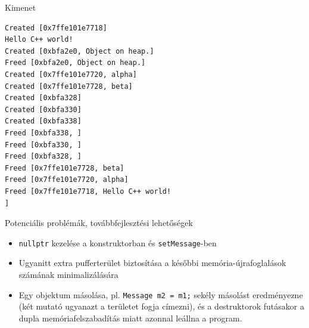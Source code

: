 \documentclass[usenames,dvipsnames,aspectratio=169]{beamer}
\begin{document}
\begin{frame}
    \begin{exampleblock}{}
        \scriptsize
        
    \end{exampleblock}
\end{frame}

\begin{frame}
    \begin{exampleblock}{}
        \footnotesize
        
    \end{exampleblock}
\end{frame}

\begin{frame}[fragile]
    \begin{block}{Kimenet}
        \scriptsize
        \vspace{-0.3cm}
        \begin{verbatim}
Created [0x7ffe101e7718]
Hello C++ world!
Created [0xbfa2e0, Object on heap.]
Freed [0xbfa2e0, Object on heap.]
Created [0x7ffe101e7720, alpha]
Created [0x7ffe101e7728, beta]
Created [0xbfa328]
Created [0xbfa330]
Created [0xbfa338]
Freed [0xbfa338, ]
Freed [0xbfa330, ]
Freed [0xbfa328, ]
Freed [0x7ffe101e7728, beta]
Freed [0x7ffe101e7720, alpha]
Freed [0x7ffe101e7718, Hello C++ world!
]
\end{verbatim}
        \vspace{-0.3cm}
    \end{block}
\end{frame}

\begin{frame}
    Potenciális problémák, továbbfejlesztési lehetőségek
    \begin{itemize}
        \item \texttt{nullptr} kezelése a konstruktorban és \texttt{setMessage}-ben
        \item Ugyanitt extra pufferterület biztosítása a későbbi memória-újrafoglalások számának minimalizálására
        \item Egy objektum másolása, pl. \texttt{Message m2 = m1;} sekély másolást eredményezne (két mutató ugyanazt a területet fogja címezni), és a destruktorok futásakor a dupla memóriafelszabadítás miatt azonnal leállna a program.
    \end{itemize}
\end{frame}
\end{document}
